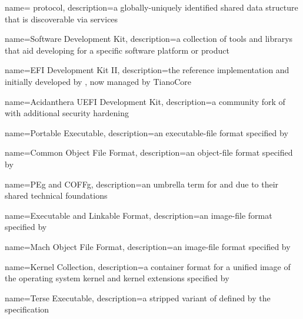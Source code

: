 {
  name={ protocol},
  description={a globally-uniquely identified shared data structure that is discoverable via  services}
}

{
  name={Software Development Kit},
  description={a collection of tools and \glspl{library} that aid developing for a specific software platform or product}
}

{
  name={EFI Development Kit II},
  description={the  reference implementation and  initially developed by , now managed by TianoCore}
}

{
  name={Acidanthera \gls{UEFI} Development Kit},
  description={a community fork of  with additional security hardening}
}

{
  name={Portable Executable},
  description={an \gls{executable-file} format specified by }
}

{
  name={Common Object File Format},
  description={an \gls{object-file} format specified by }
}

{
  name={\gls{PEg} and \gls{COFFg}},
  description={an umbrella term for  and  due to their shared technical foundations}
}

{
  name={Executable and Linkable Format},
  description={an \gls{image-file} format specified by }
}

{
  name={Mach Object File Format},
  description={an \gls{image-file} format specified by }
}

{
  name={Kernel Collection},
  description={a  container format for a unified \gls{image} of the operating system kernel and kernel extensions specified by }
}

{
  name={Terse Executable},
  description={a stripped variant of  defined by the  specification}
}

